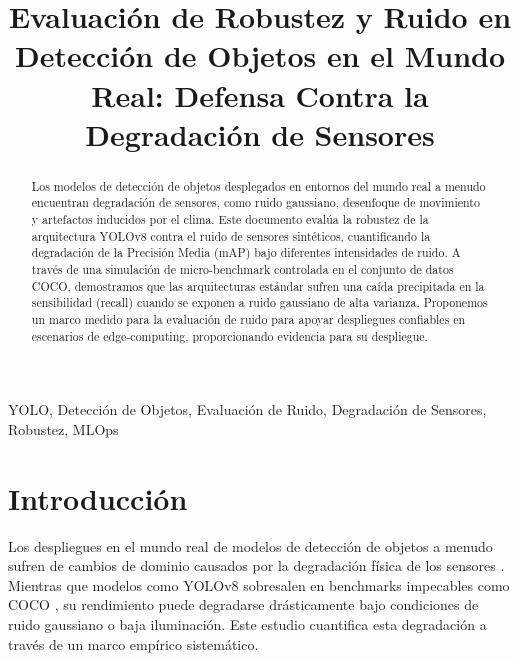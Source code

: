 \documentclass[conference]{IEEEtran}
\begin{document}
\title{Evaluación de Robustez y Ruido en Detección de Objetos en el Mundo Real: Defensa Contra la Degradación de Sensores}

\author{
}

\maketitle

\begin{abstract}
Los modelos de detección de objetos desplegados en entornos del mundo real a menudo encuentran degradación de sensores, como ruido gaussiano, desenfoque de movimiento y artefactos inducidos por el clima. Este documento evalúa la robustez de la arquitectura YOLOv8 contra el ruido de sensores sintéticos, cuantificando la degradación de la Precisión Media (mAP) bajo diferentes intensidades de ruido. A través de una simulación de micro-benchmark controlada en el conjunto de datos COCO, demostramos que las arquitecturas estándar sufren una caída precipitada en la sensibilidad (recall) cuando se exponen a ruido gaussiano de alta varianza. Proponemos un marco medido para la evaluación de ruido para apoyar despliegues confiables en escenarios de edge-computing, proporcionando evidencia para su despliegue.
\end{abstract}

\begin{IEEEkeywords}
YOLO, Detección de Objetos, Evaluación de Ruido, Degradación de Sensores, Robustez, MLOps
\end{IEEEkeywords}

\section{Introducción}
Los despliegues en el mundo real de modelos de detección de objetos a menudo sufren de cambios de dominio causados por la degradación física de los sensores \cite{hendrycks2019robustness}. Mientras que modelos como YOLOv8 \cite{jocher2023ultralytics} sobresalen en benchmarks impecables como COCO \cite{lin2014microsoft}, su rendimiento puede degradarse drásticamente bajo condiciones de ruido gaussiano o baja iluminación. Este estudio cuantifica esta degradación a través de un marco empírico sistemático.
\end{document}
